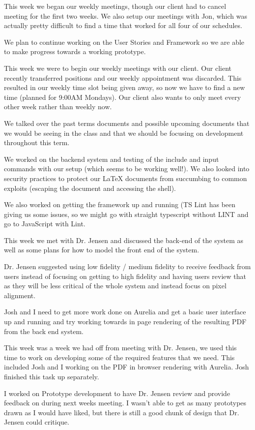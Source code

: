 \documentclass[onecolumn, draftclsnofoot,10pt, compsoc]{IEEEtran}
\begin{document}
This week we began our weekly meetings, though our client had to cancel
meeting for the first two weeks. We also setup our meetings with Jon, which was
actually pretty difficult to find a time that worked for all four of our schedules.

We plan to continue working on the User Stories and Framework so we are able
to make progress towards a working prototype.

This week we were to begin our weekly meetings with our client.
Our client recently transferred positions and our weekly appointment was
discarded. This resulted in our weekly time slot being given away, so now we
have to find a new time (planned for 9:00AM Mondays). Our client also wants
to only meet every other week rather than weekly now.

We talked over the past terms documents and possible upcoming documents that
we would be seeing in the class and that we should be focusing on development
throughout this term.

We worked on the backend system and testing of the include and input commands
with our setup (which seems to be working well!). We also looked into security
practices to protect our LaTeX documents from succumbing to common exploits
(escaping the document and accessing the shell).

We also worked on getting the framework up and running (TS Lint has been giving
us some issues, so we might go with straight typescript without LINT and go to
JavaScript with Lint.

This week we met with Dr. Jensen and discussed the back-end of the system as
well as some plans for how to model the front end of the system.

Dr. Jensen suggested using low fidelity / medium fidelity to receive feedback
from users instead of focusing on getting to high fidelity and having users
review that as they will be less critical of the whole system and instead
focus on pixel alignment.

Josh and I need to get more work done on Aurelia and get a basic user interface
up and running and try working towards in page rendering of the resulting
PDF from the back end system.


This week was a week we had off from meeting with Dr. Jensen, we used this time
to work on developing some of the required features that we need. This
included Josh and I working on the PDF in browser rendering with Aurelia.
Josh finished this task up separately.

I worked on Prototype development to have Dr. Jensen review and provide
feedback on during next weeks meeting. I wasn't able to get as many prototypes
drawn as I would have liked, but there is still a good chunk of design that
Dr. Jensen could critique.
\end{document}
